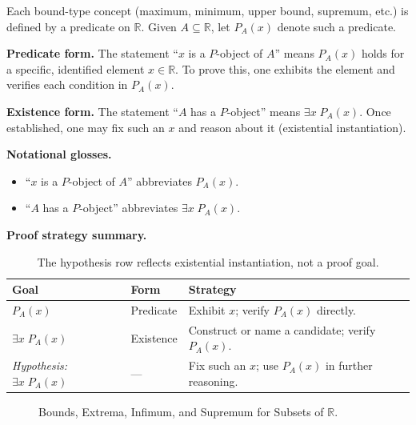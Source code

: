 \begin{remark}
Each bound-type concept (maximum, minimum, upper bound, supremum, etc.)
is defined by a predicate on $\mathbb{R}$. Given $A \subseteq \mathbb{R}$,
let $P_A(x)$ denote such a predicate.

\medskip
\textbf{Predicate form.}
The statement ``$x$ is a $P$-object of $A$'' means $P_A(x)$ holds for a
specific, identified element $x \in \mathbb{R}$. To prove this, one
exhibits the element and verifies each condition in $P_A(x)$.

\medskip
\textbf{Existence form.}
The statement ``$A$ has a $P$-object'' means $\exists x\; P_A(x)$.
Once established, one may fix such an $x$ and reason about it
(existential instantiation).

\medskip
\textbf{Notational glosses.}
\begin{itemize}
  \item ``$x$ is a $P$-object of $A$'' abbreviates $P_A(x)$.
  \item ``$A$ has a $P$-object'' abbreviates $\exists x\; P_A(x)$.
\end{itemize}

\medskip
\textbf{Proof strategy summary.}
\begin{table}[h]
\centering
\renewcommand{\arraystretch}{1.4}
\begin{tabular}{@{} p{4cm} p{3cm} p{6cm} @{}}
\toprule
\textbf{Goal} & \textbf{Form} & \textbf{Strategy} \\
\midrule
$P_A(x)$ & Predicate & Exhibit $x$; verify $P_A(x)$ directly. \\
\addlinespace[0.3em]
$\exists x\; P_A(x)$ & Existence & Construct or name a candidate; verify $P_A(x)$. \\
\midrule
\textit{Hypothesis:} $\exists x\; P_A(x)$ & --- & Fix such an $x$; use $P_A(x)$ in further reasoning. \\
\bottomrule
\end{tabular}
\caption*{\footnotesize The hypothesis row reflects existential instantiation,
not a proof goal.}
\end{table}
\end{remark}

\begin{figure}[h]
    \centering
    
    \caption{Bounds, Extrema, Infimum, and Supremum for Subsets of $\mathbb{R}$.}
    \label{fig:bounds-extrema}
\end{figure}


